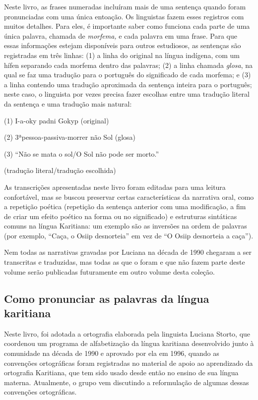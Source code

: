 Neste livro, as frases numeradas incluíram mais de uma sentença quando
foram pronunciadas com uma única entoação. Os linguistas fazem esses
registros com muitos detalhes. Para eles, é importante saber como
funciona cada parte de uma única palavra, chamada de \emph{morfema,} e
cada palavra em uma frase. Para que essas informações estejam
disponíveis para outros estudiosos, as sentenças são registradas em três
linhas: (1) a linha do original na língua indígena, com um hífen
separando cada morfema dentro das palavras; (2) a linha chamada
\emph{glosa}, na qual se faz uma tradução para o português do
significado de cada morfema; e (3) a linha contendo uma tradução
aproximada da sentença inteira para o português; neste caso, o linguista
por vezes precisa fazer escolhas entre uma tradução literal da sentença
e uma tradução mais natural:

(1) I-a-oky padni Gokyp (original)

(2) 3ªpessoa-passiva-morrer não Sol (glosa)

(3) ``Não se mata o sol/O Sol não pode ser morto.''

(tradução literal/tradução escolhida)

As transcrições apresentadas neste livro foram editadas para uma leitura
confortável, mas se buscou preservar certas características da narrativa
oral, como a repetição poética (repetição da sentença anterior com uma
modificação, a fim de criar um efeito poético na forma ou no
significado) e estruturas sintáticas comuns na língua Karitiana: um
exemplo são as inversões na ordem de palavras (por exemplo, ``Caça, o
Osiip desnorteia'' em vez de ``O Osiip desnorteia a caça'').

Nem todas as narrativas gravadas por Luciana na década de 1990 chegaram
a ser transcritas e traduzidas, mas todas as que o foram e que não fazem
parte deste volume serão publicadas futuramente em outro volume desta
coleção.

\subsection{Como pronunciar as palavras da língua
karitiana}\label{como-pronunciar-as-palavras-da-luxedngua-karitiana}

Neste livro, foi adotada a ortografia elaborada pela linguista Luciana
Storto, que coordenou um programa de alfabetização da língua karitiana
desenvolvido junto à comunidade na década de 1990 e aprovado por ela em
1996, quando as convenções ortográficas foram registradas no material de
apoio ao aprendizado da ortografia Karitiana, que tem sido usado desde
então no ensino de sua língua materna. Atualmente, o grupo vem
discutindo a reformulação de algumas dessas convenções ortográficas.

